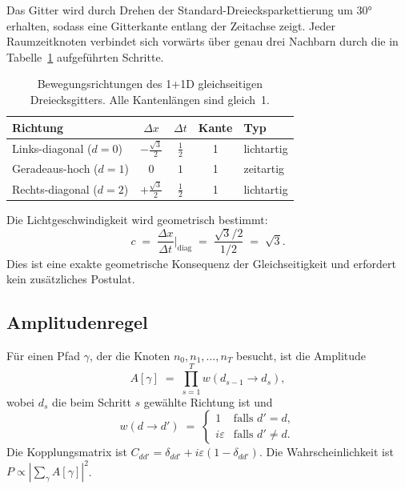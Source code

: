 \documentclass[twocolumn,showpacs,preprintnumbers,amsmath,amssymb]{revtex4-2}
\newcommand{\eps}{\varepsilon}
\newcommand{\sqh}{\frac{\sqrt{3}}{2}}
\begin{document}
Das Gitter wird durch Drehen der Standard-Dreiecksparkettierung um $30°$
erhalten, sodass eine Gitterkante entlang der Zeitachse zeigt.
Jeder Raumzeitknoten verbindet sich vorwärts über genau drei Nachbarn durch
die in Tabelle~\ref{tab:moves1d} aufgeführten Schritte.

\begin{table}[b]
\caption{Bewegungsrichtungen des 1+1D gleichseitigen Dreiecksgitters.
Alle Kantenlängen sind gleich~1.}
\label{tab:moves1d}
\begin{ruledtabular}
\begin{tabular}{lcccl}
Richtung & $\Delta x$ & $\Delta t$ & Kante & Typ \\
\hline
Links-diagonal  ($d=0$) & $-\sqh$ & $\tfrac{1}{2}$ & 1 & lichtartig \\
Geradeaus-hoch  ($d=1$) & $0$              & $1$            & 1 & zeitartig  \\
Rechts-diagonal ($d=2$) & $+\sqh$ & $\tfrac{1}{2}$ & 1 & lichtartig \\
\end{tabular}
\end{ruledtabular}
\end{table}

Die Lichtgeschwindigkeit wird geometrisch bestimmt:
\begin{equation}
  c \;=\; \frac{\Delta x}{\Delta t}\bigg|_{\mathrm{diag}}
    \;=\; \frac{\sqrt{3}/2}{1/2} \;=\; \sqrt{3}.
  \label{eq:c}
\end{equation}
Dies ist eine exakte geometrische Konsequenz der Gleichseitigkeit und erfordert
kein zusätzliches Postulat.

\subsection{Amplitudenregel}

Für einen Pfad $\gamma$, der die Knoten $n_0, n_1, \ldots, n_T$ besucht,
ist die Amplitude
\begin{equation}
  A[\gamma] \;=\; \prod_{s=1}^{T} w(d_{s-1} \to d_s),
  \label{eq:amplitude_rule}
\end{equation}
wobei $d_s$ die beim Schritt $s$ gewählte Richtung ist und
\begin{equation}
  w(d \to d') \;=\;
  \begin{cases}
    1    & \text{falls } d' = d, \\
    i\eps & \text{falls } d' \ne d.
  \end{cases}
  \label{eq:w}
\end{equation}
Die Kopplungsmatrix ist $C_{dd'} = \delta_{dd'} + i\eps(1 - \delta_{dd'})$.
Die Wahrscheinlichkeit ist $P \propto |{\sum_\gamma A[\gamma]}|^2$.
\end{document}
